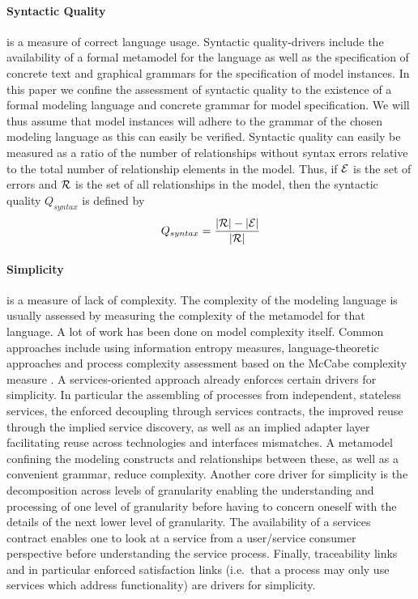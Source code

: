 \paragraph{Syntactic Quality} is a measure of correct language usage. Syntactic quality-drivers include the availability of a formal metamodel for the language as well as the specification of concrete text and graphical grammars for the specification of model instances. In this paper we confine the assessment of syntactic quality to the existence of a formal modeling language and concrete grammar for model specification. We will thus assume that model instances will adhere to the grammar of the chosen modeling language as this can easily be verified. Syntactic quality can easily be measured as a ratio of the number of relationships without syntax errors relative to the total number of relationship elements in the model. Thus, if $\cal{E}$ is the set of errors and $\cal{R}$ is the set of all relationships in the model, then the syntactic quality $Q_{syntax}$ is defined by
\begin{equation}
  Q_{syntax} = \frac{|\cal{R}| - |\cal{E}|}{|\cal{R}|}
\end{equation}

\paragraph{Simplicity} is a measure of lack of complexity. The complexity of the modeling language is usually assessed by measuring the complexity of the metamodel for that language\cite{mohagheghi_evaluating_2007}. A lot of work has been done on model complexity itself. Common approaches include using information entropy measures\cite{abrahamsson_extreme_2004}, language-theoretic approaches\cite{podgorelec_estimating_2007} and process complexity assessment based on the McCabe complexity measure \cite{mccabe_complexity_1976}. A services-oriented approach already enforces certain drivers for simplicity. In particular the assembling of processes from independent, stateless services, the enforced decoupling through services contracts, the improved reuse through the implied service discovery, as well as an implied adapter layer facilitating reuse across technologies and interfaces mismatches. A metamodel confining the modeling constructs and relationships between these, as well as a convenient grammar, reduce complexity. Another core driver for simplicity is the decomposition across levels of granularity enabling the understanding and processing of one level of granularity before having to concern oneself with the details of the next lower level of granularity. The availability of a services contract enables one to look at a service from a user/service consumer perspective before understanding the service process. Finally, traceability links and in particular enforced satisfaction links (i.e.\ that a process may only use services which address functionality) are drivers for simplicity.

